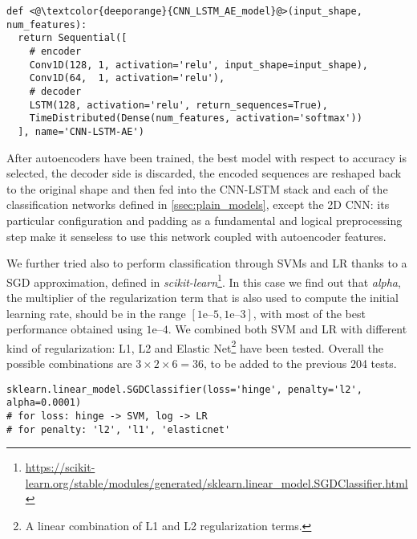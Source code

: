 \begin{minipage}[c]{.9\columnwidth}
\vspace*{.2em}
\begin{lstlisting}
def <@\textcolor{deeporange}{CNN_LSTM_AE_model}@>(input_shape, num_features):
  return Sequential([
    # encoder
    Conv1D(128, 1, activation='relu', input_shape=input_shape),
    Conv1D(64,  1, activation='relu'),
    # decoder
    LSTM(128, activation='relu', return_sequences=True),
    TimeDistributed(Dense(num_features, activation='softmax'))
  ], name='CNN-LSTM-AE')
\end{lstlisting}
\end{minipage}

After autoencoders have been trained, the best model with respect to accuracy is selected, the decoder side is discarded, the encoded sequences are reshaped back to the original shape and then fed into the CNN-LSTM stack and each of the classification networks defined in \ref{ssec:plain_models}, except the 2D CNN: its particular configuration and padding as a fundamental and logical preprocessing step make it senseless to use this network coupled with autoencoder features.

We further tried also to perform classification through SVMs and LR thanks to a SGD approximation, defined in \textit{scikit-learn}\footnote{\url{https://scikit-learn.org/stable/modules/generated/sklearn.linear_model.SGDClassifier.html}}.
In this case we find out that \textit{alpha}, the multiplier of the regularization term that is also used to compute the initial learning rate, should be in the range $[1\mathrm{e}{\text{--}5},1\mathrm{e}{\text{--}3}]$, with most of the best performance obtained using $1\mathrm{e}{\text{--}4}$.
We combined both SVM and LR with different kind of regularization: L1, L2 and Elastic Net\footnote{A linear combination of L1 and L2 regularization terms.} have been tested.
Overall the possible combinations are $3\times2\times6 = 36$, to be added to the previous 204 tests.

\begin{minipage}[c]{.9\columnwidth}
\vspace*{.5em}
\begin{lstlisting}
sklearn.linear_model.SGDClassifier(loss='hinge', penalty='l2', alpha=0.0001)
# for loss: hinge -> SVM, log -> LR
# for penalty: 'l2', 'l1', 'elasticnet'
\end{lstlisting}
\end{minipage}


